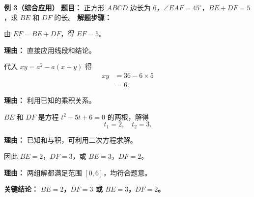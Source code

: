 \begin{examplebox}
	\medskip
	\textbf{\textcolor{CExample}{例 3（综合应用）}}
	\textbf{\textcolor{CExample}{题目：}}
	正方形 $ABCD$ 边长为 $6$，$\angle EAF = 45^\circ$，$BE+DF=5$，求 $BE$ 和 $DF$ 的长。
	\textbf{\textcolor{CExample}{解题步骤：}}
	\begin{description}[style=nextline, leftmargin=2.8em, labelsep=0.5em, itemsep=0.45em]
		\item[\textbf{第一步（确定$EF$）：}]
			由 $EF = BE+DF$，得 $EF = 5$。
			\par\textbf{理由：} 直接应用线段和结论。
		\item[\textbf{第二步（求乘积$xy$）：}]
			代入 $xy = a^2 - a(x+y)$ 得
			\[
				\begin{aligned}
					xy &= 36 - 6 \times 5 \\ &= 6.
			\end{aligned}
			\]
			\par\textbf{理由：} 利用已知的乘积关系。
		\item[\textbf{第三步（逆用韦达定理）：}]
			$BE$ 和 $DF$ 是方程 $t^2 - 5t + 6 = 0$ 的两根，解得
			\[
				t_1 = 2,\quad t_2 = 3.
			\]
			\par\textbf{理由：} 已知和与积，可利用二次方程求解。
		\item[\textbf{第四步（得出结论）：}]
			因此 $BE=2$，$DF=3$，或 $BE=3$，$DF=2$。
			\par\textbf{理由：} 两组解都满足范围 $[0,6]$，均符合题意。
	\end{description}
	\textbf{\textcolor{CExample}{关键结论：}}
	\textbf{$BE=2$，$DF=3$ 或 $BE=3$，$DF=2$。}
\end{examplebox}
